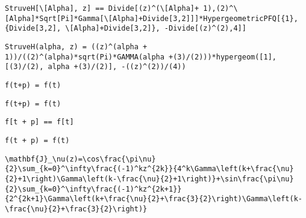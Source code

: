 \newsavebox\CCMM
\begin{lrbox}{\CCMM}
 \begin{minipage}[t]{0.82\textwidth}
  \lstinline[language={[latex]TeX},mathescape,breaklines=true]"StruveH[\[Alpha], z] == Divide[(z)^(\[Alpha]+ 1),(2)^\[Alpha]*Sqrt[Pi]*Gamma[\[Alpha]+Divide[3,2]]]*HypergeometricPFQ[{1}, {Divide[3,2], \[Alpha]+Divide[3,2]}, -Divide[(z)^(2),4]]"
 \end{minipage}
\end{lrbox}
\newsavebox\CCMA
\begin{lrbox}{\CCMA}
 \begin{minipage}[t]{0.82\textwidth}
  \lstinline[language={[latex]TeX},mathescape,breaklines=true]"StruveH(alpha, z) = ((z)^(alpha + 1))/((2)^(alpha)*sqrt(Pi)*GAMMA(alpha +(3)/(2)))*hypergeom([1], [(3)/(2), alpha +(3)/(2)], -((z)^(2))/(4))"
 \end{minipage}
\end{lrbox}
\newsavebox\CDT
\begin{lrbox}{\CDT}
 \begin{minipage}[t]{0.82\textwidth}
  \lstinline[language={[latex]TeX},mathescape,breaklines=true]"f(t+p) = f(t)"
 \end{minipage}
\end{lrbox}
\newsavebox\CDST
\begin{lrbox}{\CDST}
 \begin{minipage}[t]{0.82\textwidth}
  \lstinline[language={[latex]TeX},mathescape,breaklines=true]"f(t+p) = f(t)"
 \end{minipage}
\end{lrbox}
\newsavebox\CDMM
\begin{lrbox}{\CDMM}
 \begin{minipage}[t]{0.82\textwidth}
  \lstinline[language={[latex]TeX},mathescape,breaklines=true]"f[t + p] == f[t]"
 \end{minipage}
\end{lrbox}
\newsavebox\CDMA
\begin{lrbox}{\CDMA}
 \begin{minipage}[t]{0.82\textwidth}
  \lstinline[language={[latex]TeX},mathescape,breaklines=true]"f(t + p) = f(t)"
 \end{minipage}
\end{lrbox}
\newsavebox\CET
\begin{lrbox}{\CET}
 \begin{minipage}[t]{0.82\textwidth}
  \lstinline[language={[latex]TeX},mathescape,breaklines=true]"\mathbf{J}_\nu(z)=\cos\frac{\pi\nu}{2}\sum_{k=0}^\infty\frac{(-1)^kz^{2k}}{4^k\Gamma\left(k+\frac{\nu}{2}+1\right)\Gamma\left(k-\frac{\nu}{2}+1\right)}+\sin\frac{\pi\nu}{2}\sum_{k=0}^\infty\frac{(-1)^kz^{2k+1}}{2^{2k+1}\Gamma\left(k+\frac{\nu}{2}+\frac{3}{2}\right)\Gamma\left(k-\frac{\nu}{2}+\frac{3}{2}\right)}"
 \end{minipage}
\end{lrbox}
